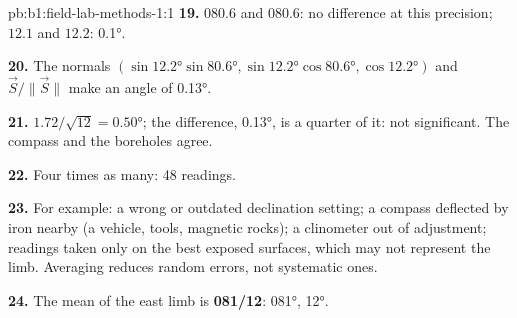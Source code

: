 \begin{solution}{pb:b1:field-lab-methods-1:1}
\textbf{19.}  $080.6$ and $080.6$: no difference at this
precision;  $12.1$ and $12.2$: \ang{0.1}.

\textbf{20.} The normals $(\sin\ang{12.2}\sin\ang{80.6},
\sin\ang{12.2}\cos\ang{80.6}, \cos\ang{12.2})$ and $\vec S/\|\vec S\|$ make
an angle of \ang{0.13}.

\textbf{21.} $1.72/\sqrt{12} = \ang{0.50}$; the difference, \ang{0.13}, is a
quarter of it: not significant. The compass and the boreholes agree.

\textbf{22.} Four times as many: 48 readings.

\textbf{23.} For example: a wrong or outdated declination setting; a compass
deflected by iron nearby (a vehicle, tools, magnetic rocks); a clinometer
out of adjustment; readings taken only on the best exposed surfaces, which
may not represent the limb. Averaging reduces random errors, not systematic
ones.

\textbf{24.} The mean  of the east limb is \textbf{081/12}:  \ang{081},  \ang{12}.
\end{solution}
